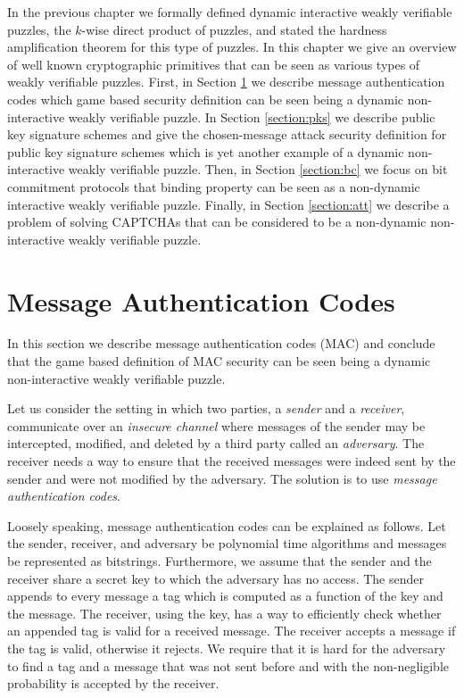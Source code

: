 %
In the previous chapter we formally defined dynamic interactive weakly verifiable puzzles, the $k$-wise direct product of puzzles,
and stated the hardness amplification theorem for this type of puzzles.
In this chapter we give an overview of well known cryptographic primitives that can be seen as various types of weakly verifiable puzzles.
First, in Section \ref{section:mac} we describe message authentication codes which game based security definition can be seen being a dynamic
non-interactive weakly verifiable puzzle.
In Section \ref{section:pks} we describe public key signature schemes and give
the chosen-message attack security definition for public key signature schemes which is yet another example of a dynamic non-interactive weakly verifiable puzzle.
Then, in Section \ref{section:bc} we focus on bit commitment protocols that binding property can be seen as a non-dynamic interactive  weakly verifiable puzzle.
Finally, in Section \ref{section:att} we describe a problem of solving CAPTCHAs that can be considered to be a non-dynamic non-interactive weakly verifiable puzzle.

\section{Message Authentication Codes}
\label{section:mac}
In this section we describe message authentication codes (MAC) and conclude that the game based definition of MAC
security can be seen being a dynamic non-interactive weakly verifiable puzzle.

Let us consider the setting in which two parties, a \textit{sender} and a \textit{receiver}, communicate over an \textit{insecure channel} where
messages of the sender may be intercepted, modified, and deleted by a third party called an \textit{adversary}.
The receiver needs a way to ensure that the received messages were indeed sent by the sender and were not modified by the adversary.
The solution is to use \textit{message authentication codes}.

Loosely speaking, message authentication codes can be explained as follows.
Let the sender, receiver, and adversary be polynomial time algorithms and messages be represented as bitstrings.
Furthermore, we assume that the sender and the receiver share a secret key to which the adversary has no access.
The sender appends to every message a tag which is computed as a function of the key and the message.
The receiver, using the key, has a way to efficiently check whether an appended tag is valid for a received message.
The receiver accepts a message if the tag is valid, otherwise it rejects.
We require that it is hard for the adversary to find a tag and a message that was not sent before and
with the non-negligible probability is accepted by the receiver.

